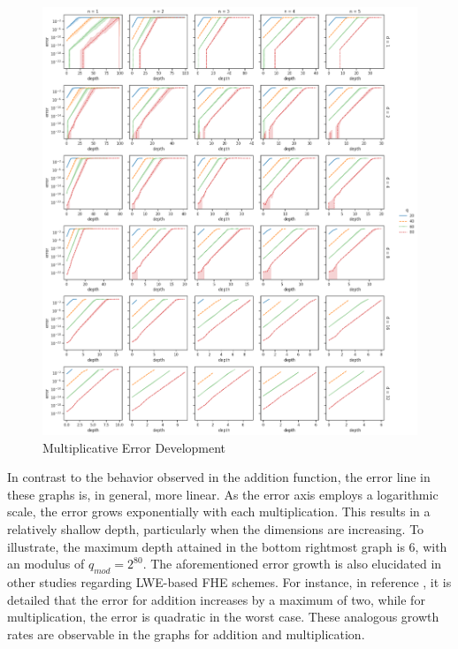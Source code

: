\begin{figure}[ht!]
  \centering
  \includegraphics[scale=0.38]{images/MulErrorDevelopment.png}
  \caption[Multiplicative Error Development]{Multiplicative Error Development}
  \label{fig:MulErrorDev}
\end{figure}

In contrast to the behavior observed in the addition function, the error line in these graphs is, in general, more linear. As the error axis employs a logarithmic scale, the error grows exponentially with each multiplication. This results in a relatively shallow depth, particularly when the dimensions are increasing. To illustrate, the maximum depth attained in the bottom rightmost graph is $6$, with an modulus of $q_{mod} = 2^{80}$. The aforementioned error growth is also elucidated in other studies regarding LWE-based FHE schemes. For instance, in reference \cite{FHEwoBottstrapping}, it is detailed that the error for addition increases by a maximum of two, while for multiplication, the error is quadratic in the worst case. These analogous growth rates are observable in the graphs for addition and multiplication.

